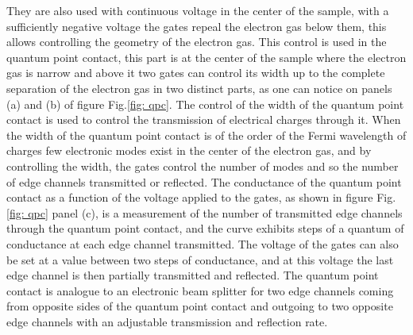 They are also used with continuous voltage in the center of the sample, with a sufficiently negative voltage the gates repeal the electron gas below them, this allows controlling the geometry of the electron gas.
This control is used in the quantum point contact, this part is at the center of the sample where the electron gas is narrow and above it two gates can control its width up to the complete separation of the electron gas in two distinct parts, as one can notice on panels (a) and (b) of figure Fig.\ref{fig: qpc}.
The control of the width of the quantum point contact is used to control the transmission of electrical charges through it.
When the width of the quantum point contact is of the order of the Fermi wavelength of charges few electronic modes exist in the center of the electron gas, and by controlling the width, the gates control the number of modes and so the number of edge channels transmitted or reflected.
The conductance of the quantum point contact as a function of the voltage applied to the gates, as shown in figure Fig.\ref{fig: qpc} panel (c), is a measurement of the number of transmitted edge channels through the quantum point contact, and the curve exhibits steps of a quantum of conductance at each edge channel transmitted.
The voltage of the gates can also be set at a value between two steps of conductance, and at this voltage the last edge channel is then partially transmitted and reflected.
The quantum point contact is analogue to an electronic beam splitter for two edge channels coming from opposite sides of the quantum point contact and outgoing to two opposite edge channels with an adjustable transmission and reflection rate.

